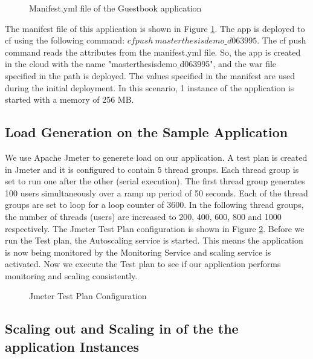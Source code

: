 \documentclass[article,type=msc,colorback,12pt,accentcolor=tud8b,table]{tudthesis}
\begin{document}
 \begin{figure}
 \begin{center}
  \makebox[\textwidth]{\texttt{[image: E2]}}
\end{center}
\caption{Manifest.yml file of the Guestbook application}
\label{fig:guestbook_manifest}
\end{figure}
The manifest file of this application is shown in Figure \ref{fig:guestbook_manifest}. The app is deployed to \gls{cf} using the following command: $ cf push \: masterthesisdemo\_d063995 $. The cf push command reads the attributes from the manifest.yml file. So, the app is created in the cloud with the name "masterthesisdemo$\_$d063995", and the war file specified in the path is deployed. The values specified in the manifest are used during the initial deployment. In this scenario, 1 instance of the application is started with a memory of 256 MB.	
	\subsection{Load Generation on the Sample Application}
	
 We use Apache Jmeter to generete load on our application. A test plan is created in Jmeter and it is configured to contain 5 thread groups. Each thread group is set to run one after the other (serial execution). The first thread group generates 100 users simultaneously over a ramp up period of 50 seconds. Each of the thread groups are set to loop for a loop counter of 3600. In the following thread groups, the number of threads (users) are increased to 200, 400, 600, 800 and 1000 respectively. The Jmeter Test Plan configuration is shown in Figure \ref{fig:jmeter_testplan}. Before we run the Test plan, the Autoscaling service is started. This means the application is now being monitored by the Monitoring Service and scaling service is activated. Now we execute the Test plan to see if our application performs monitoring and scaling consistently.
 
  \begin{figure}[h]
  	\begin{center}
  		\makebox[\textwidth]{\texttt{[image: E3]}}
  	\end{center}
  	\caption{Jmeter Test Plan Configuration}
  	\label{fig:jmeter_testplan}
  \end{figure}
	
	\subsection{Scaling out and Scaling in of the the application Instances}
		
\end{document}
